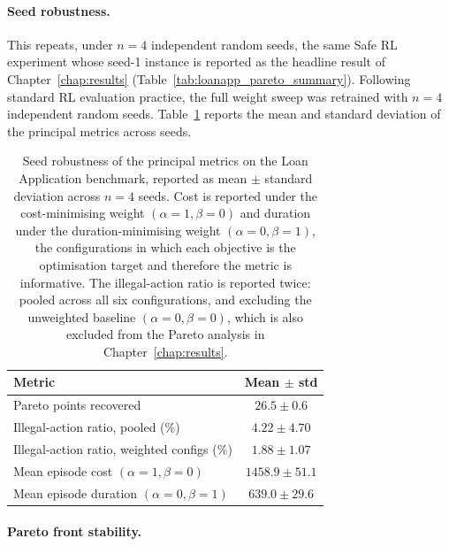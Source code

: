 \paragraph{Seed robustness.}

This repeats, under $n=4$ independent random seeds, the same Safe
\ac{RL} experiment whose seed-1 instance is reported as the headline
result of Chapter~\ref{chap:results}
(Table~\ref{tab:loanapp_pareto_summary}). Following standard \ac{RL}
evaluation practice, the full weight sweep was retrained with $n=4$
independent random seeds.
Table~\ref{tab:seed_variance} reports the mean and standard deviation
of the principal metrics across seeds.

\begin{table}[H]
\centering
\caption{Seed robustness of the principal metrics on the Loan
Application benchmark, reported as mean $\pm$ standard deviation across
$n=4$ seeds. Cost is reported under the cost-minimising weight
$(\alpha{=}1,\beta{=}0)$ and duration under the duration-minimising
weight $(\alpha{=}0,\beta{=}1)$, the configurations in which each
objective is the optimisation target and therefore the metric is
informative. The illegal-action ratio is reported twice: pooled across
all six configurations, and excluding the unweighted baseline
$(\alpha{=}0,\beta{=}0)$, which is also excluded from the Pareto
analysis in Chapter~\ref{chap:results}.}
\label{tab:seed_variance}
\begin{tabular}{lc}
\toprule
\textbf{Metric} & \textbf{Mean $\pm$ std} \\
\midrule
Pareto points recovered            & $26.5 \pm 0.6$ \\
Illegal-action ratio, pooled (\%)  & $4.22 \pm 4.70$ \\
Illegal-action ratio, weighted configs (\%) & $1.88 \pm 1.07$ \\
Mean episode cost $(\alpha{=}1,\beta{=}0)$     & $1458.9 \pm 51.1$ \\
Mean episode duration $(\alpha{=}0,\beta{=}1)$ & $639.0 \pm 29.6$ \\
\bottomrule
\end{tabular}
\end{table}

\paragraph{Pareto front stability.}


